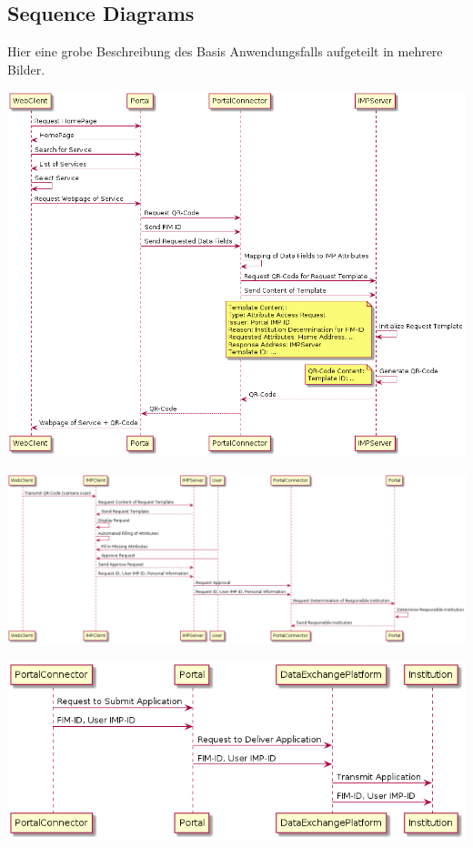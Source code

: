 \documentclass[
     12pt,         %
     a4paper,      %
     BCOR=10mm,version=first,     %
     DIV=14,version=first,        %
     ]{scrreprt}
\begin{document}
\subsection{Sequence Diagrams}

Hier eine grobe Beschreibung des Basis Anwendungsfalls aufgeteilt in mehrere Bilder.

\includegraphics[width=15cm]{Selection Administrative Service.png}

\includegraphics[width=15cm]{Institution Determination.png}

\includegraphics[width=15cm]{Notify Institution.png}
\end{document}
